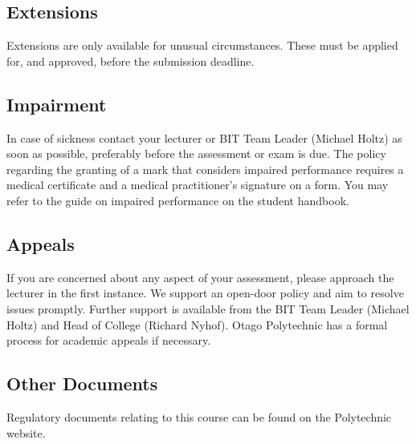 \documentclass{article}
\begin{document}
\subsection*{Extensions}
Extensions are only available for unusual circumstances. These must be applied for, and approved, before the submission deadline.

\subsection*{Impairment}
In case of sickness contact your lecturer or BIT Team Leader (Michael Holtz) as soon as possible, preferably before the assessment or exam is due. The policy regarding the granting of a mark that considers impaired performance requires a medical certificate and a medical practitioner’s signature on a form. You may refer to the guide on impaired performance on the student handbook.

\subsection*{Appeals}
If you are concerned about any aspect of your assessment, please approach the lecturer in the first instance. We support an open-door policy and aim to resolve issues promptly. Further support is available from the BIT Team Leader (Michael Holtz) and Head of College (Richard Nyhof). Otago Polytechnic has a formal process for academic appeals if necessary.

\subsection*{Other Documents}
Regulatory documents relating to this course can be found on the Polytechnic website.
\end{document}
